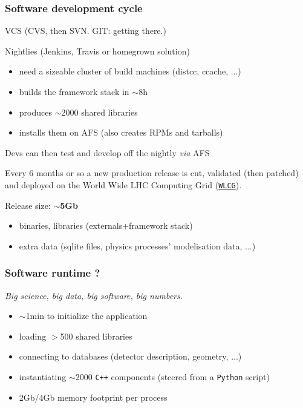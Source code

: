 \documentclass[9pt]{beamer}
\newcommand{\myblue} [1] {{\color{blue}#1}}
\begin{document}
\begin{frame}[fragile]
\frametitle{Software development cycle}


VCS (CVS, then SVN. GIT: getting there.)


	\begin{block}{}
Nightlies (Jenkins, Travis or homegrown solution)


\begin{itemize}
\item need a sizeable cluster of build machines (distcc, ccache, ...)
\item builds the framework stack in $\sim$8h
\item produces $\sim$2000 shared libraries
\item installs them on AFS (also creates RPMs and tarballs)
\end{itemize}

Devs can then test and develop off the nightly \emph{via} AFS

	\end{block}{}

	Every 6 months or so a new production release is cut, validated (then patched) and deployed on the World Wide LHC Computing Grid (\myblue{\href{http://wlcg.web.cern.ch/}{\texttt{WLCG}}}).


	\begin{block}{}
Release size: \textbf{$\sim$5Gb}


\begin{itemize}
\item binaries, libraries (externals+framework stack)
\item extra data (sqlite files, physics processes' modelisation data, ...)
\end{itemize}

	\end{block}{}

\end{frame}

\begin{frame}[fragile]
\frametitle{Software runtime ?}


	\emph{Big science, big data, big software, big numbers.}

	\begin{block}{}
\begin{itemize}
\item $\sim$1min to initialize the application
\item loading $>$500 shared libraries
\item connecting to databases (detector description, geometry, ...)
\item instantiating $\sim$2000 \texttt{C++} components (steered from a \texttt{Python} script)
\item 2Gb/4Gb memory footprint per process
\end{itemize}
	\end{block}{}

\end{frame}
\end{document}
